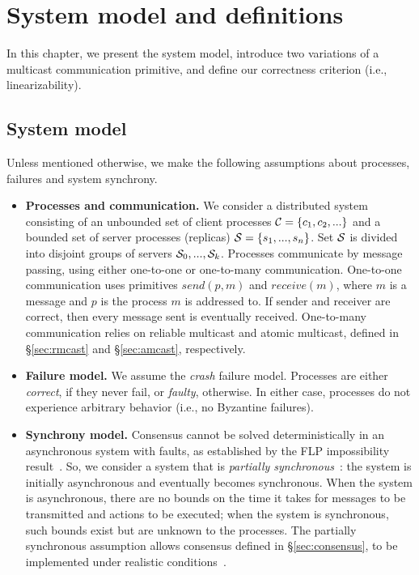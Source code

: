 \chapter[System model and definitions]{System model and definitions}
\label{sec:sysmodel}

In this chapter, we present the system model, introduce two variations of a
multicast communication primitive, and define our correctness criterion (i.e.,
linearizability).

\section{System model}

Unless mentioned otherwise, we make the following assumptions about processes,
failures and system synchrony.


\begin{itemize}
  \item \textbf{Processes and communication.} We consider a distributed system
  consisting of an unbounded set of client processes $\mathcal{C} = \{c_1, c_2, ...\}$
  and a bounded set of server processes (replicas) $\mathcal{S} = \{s_1, ..., s_n\}$.
  Set $\mathcal{S}$ is divided into disjoint groups of servers $\mathcal{S}_0, ..., \mathcal{S}_k$.
  Processes communicate by message passing, using either one-to-one or
  one-to-many communication. One-to-one communication uses primitives
  $send(p,m)$ and $receive(m)$, where $m$ is a message and $p$ is the process
  $m$ is addressed to. If sender and receiver are correct, then every message
  sent is eventually received. One-to-many communication relies on reliable
  multicast and atomic multicast, defined in \S\ref{sec:rmcast} and
  \S\ref{sec:amcast}, respectively.
  \item \textbf{Failure model.} We assume the \emph{crash} failure model.
  Processes are either \emph{correct}, if they never fail, or \emph{faulty},
  otherwise. In either case, processes do not experience arbitrary behavior
  (i.e., no Byzantine failures).
  \item \textbf{Synchrony model.} Consensus cannot be solved deterministically
  in an asynchronous system with faults, as established by the FLP impossibility
  result~\cite{FLP85}. So, we consider a system that is \emph{partially
  synchronous}~\cite{DLS88}: the system is initially asynchronous and eventually becomes
  synchronous. When the system is asynchronous, there are no bounds on the time
  it takes for messages to be transmitted and actions to be executed; when the
  system  is synchronous, such bounds exist but are unknown to the processes.
  The partially synchronous assumption allows consensus defined in
  \S\ref{sec:consensus}, to be implemented under realistic
  conditions~\cite{FLP85,Lam98}.
\end{itemize}

